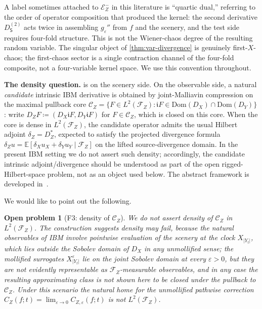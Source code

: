 \documentclass[EJP]{ejpecp}
\newtheorem{openproblem}[theorem]{Open problem}
\renewcommand{\E}{\mathbb{E}}
\newcommand{\Dom}{\mathrm{Dom}}
\newcommand{\Energy}{\mathcal{E}}
\newcommand{\Source}{\mathsf{S}}
\renewcommand{\iota}{\mathfrak{i}}
\newcommand{\IBM}{Z}
\begin{document}
\begin{remark}
\label{rem:quartic-not-chaos}
A label sometimes attached to $\Energy_{\IBM}^{-}$ in this
literature is ``quartic dual,'' referring to the order of operator
composition that produced the kernel: the second derivative
$D_\Source^{(2)}$ acts twice in assembling $g_\varepsilon''$ from
$f$ and the scenery, and the test side requires four-fold structure.
This is not the Wiener-chaos degree of the resulting random
variable. The singular object of \cref{thm:var-divergence} is
genuinely first-$X$-chaos; the first-chaos sector is a single
contraction channel of the four-fold composite, not a four-variable
kernel space. We use this convention throughout.
\end{remark}

\smallskip
\noindent\textbf{The density question.}
 is on the scenery side. On the
observable side, a natural \emph{candidate} intrinsic IBM derivative
is obtained by joint-Malliavin compression on the maximal pullback
core
$\mathcal C_\IBM=\{F\in L^{2}(\mathcal F_\IBM):\iota F\in\Dom(D_X)\cap\Dom(D_Y)\}$:
write $D_\IBM F\coloneqq(D_X\iota F,D_Y\iota F)$ for $F\in\mathcal C_\IBM$,
which is closed on this core. When the core is dense in
$L^{2}(\mathcal F_\IBM)$, the candidate operator admits the usual
Hilbert adjoint $\delta_\IBM=D_\IBM^{*}$, expected to satisfy the
projected divergence formula
$\delta_\IBM u=\E[\delta_X u_X+\delta_Y u_Y\mid\mathcal F_\IBM]$ on
the lifted source-divergence domain. In the present IBM setting we
do not assert such density; accordingly, the candidate intrinsic
adjoint/divergence should be understood as part of the open
rigged-Hilbert-space problem, not as an object used below. The
abstract framework is developed
in~\cite{Fontes-OperatorDerivative}.

We would like to point out the following.

\begin{openproblem}[F3: density of $\mathcal C_\IBM$]\label{flag:density}
We do not assert density of $\mathcal C_\IBM$ in
$L^{2}(\mathcal F_\IBM)$. The construction suggests density may
fail, because the natural observables of IBM involve pointwise
evaluation of the scenery at the clock $X_{|Y_t|}$, which lies
outside the Sobolev domain of $D_X$ in any unmollified sense; the
mollified surrogates $X^{\varepsilon}_{|Y_t|}$ lie on the joint
Sobolev domain at every $\varepsilon>0$, but they are not
evidently representable as $\mathcal F_\IBM$-measurable observables,
and in any case the resulting approximating class is not shown here
to be closed under the pullback to $\mathcal C_\IBM$. Under this
scenario the natural home for the unmollified pathwise correction
$C_\IBM(f;t)=\lim_{\varepsilon\to 0}C_{\IBM,\varepsilon}(f;t)$ is
not $L^{2}(\mathcal F_\IBM)$.
\end{openproblem}
\end{document}
